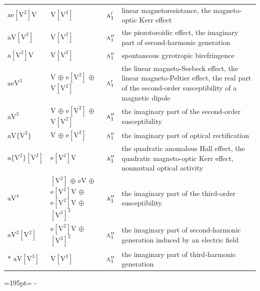 \documentclass[10pt,a4paper]{article}
\newcommand{\needspace}[1]{\par\penalty-100\begingroup\dimen0=#1\relax\dimen2=\pagegoal
  \advance\dimen2-\pagetotal\ifdim\dimen0>\dimen2\relax\ifdim\dimen2>0pt\vfil\break\fi\fi
  \endgroup}
\numberwithin{equation}{section}
\newcommand{\irr}[1]{\text{\normalfont\scshape #1}}
\newcommand{\jahn}[1]{\mathrm{#1}}
\newlength{\fillwidth}\newlength{\cellwidth}\newlength{\colwidth}
\begin{document}
{\begin{longtable}{@{}lll>{\RaggedRight\arraybackslash}p{\fillwidth}@{}}
$\jahn{ae[V^{2}]V}$ & $\jahn{V[V^{2}]}$ & $\irr{a}_{1}'$ & linear magnetoresistance, the magneto-optic Kerr effect\\
$\jahn{aV[V^{2}]}$ & $\jahn{V[V^{2}]}$ & $\irr{a}_{1}''$ & the piezotoroidic effect, the imaginary part of second-harmonic generation\\
$\jahn{a[V^{2}]V}$ & $\jahn{V[V^{2}]}$ & $\irr{a}_{1}''$ & spontaneous gyrotropic birefringence\\
$\jahn{aeV^{3}}$ & $\jahn{V}$ $\oplus$ $\jahn{e[V^{2}]}$ $\oplus$ $\jahn{V[V^{2}]}$ & $\irr{a}_{1}'$ & the linear magneto-Seebeck effect, the linear magneto-Peltier effect, the real part of the second-order susceptibility of a magnetic dipole\\
$\jahn{aV^{3}}$ & $\jahn{V}$ $\oplus$ $\jahn{e[V^{2}]}$ $\oplus$ $\jahn{V[V^{2}]}$ & $\irr{a}_{1}''$ & the imaginary part of the second-order susceptibility\\
$\jahn{aV\{V^{2}\}}$ & $\jahn{V}$ $\oplus$ $\jahn{e[V^{2}]}$ & $\irr{a}_{1}''$ & the imaginary part of optical rectification\\
$\jahn{a\{V^{2}\}[V^{2}]}$ & $\jahn{e[V^{2}]V}$ & $\irr{a}_{1}''$ & the quadratic anomalous Hall effect, the quadratic magneto-optic Kerr effect, nonmutual optical activity\\
$\jahn{aV^{4}}$ & $\jahn{[V^{2}]}$ $\oplus$ $\jahn{eV}$ $\oplus$ $\jahn{e[V^{2}]V}$ $\oplus$ $\jahn{e[V^{2}]V}$ $\oplus$ $\jahn{[V^{2}]^{2}}$ & $\irr{a}_{1}''$ & the imaginary part of the third-order susceptibility\\
$\jahn{aV^{2}[V^{2}]}$ & $\jahn{e[V^{2}]V}$ $\oplus$ $\jahn{[V^{2}]^{2}}$ & $\irr{a}_{1}''$ & the imaginary part of second-harmonic generation induced by an electric field\\*
$\jahn{aV[V^{3}]}$ & $\jahn{V[V^{3}]}$ & $\irr{a}_{1}''$ & the imaginary part of third-harmonic generation\\
\bottomrule\end{longtable}}
\needspace{195pt}
\end{document}
